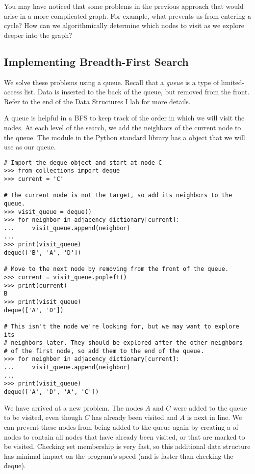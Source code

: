 You may have noticed that some problems in the previous approach that would arise in a more complicated graph.
For example, what prevents us from entering a cycle?
How can we algorithmically determine which nodes to visit as we explore deeper into the graph?

\subsection*{Implementing Breadth-First Search}

We solve these problems using a queue.
Recall that a \emph{queue} is a type of limited-access list.
Data is inserted to the back of the queue, but removed from the front.
Refer to the end of the Data Structures I lab for more details.

A queue is helpful in a BFS to keep track of the order in which we will visit the nodes.
At each level of the search, we add the neighbors of the current node to the queue.
The  module in the Python standard library has a  object that we will use as our queue.

\begin{lstlisting}
# Import the deque object and start at node C
>>> from collections import deque
>>> current = 'C'

# The current node is not the target, so add its neighbors to the queue.
>>> visit_queue = deque()
>>> for neighbor in adjacency_dictionary[current]:
...     visit_queue.append(neighbor)
...
>>> print(visit_queue)
deque(['B', 'A', 'D'])

# Move to the next node by removing from the front of the queue.
>>> current = visit_queue.popleft()
>>> print(current)
B
>>> print(visit_queue)
deque(['A', 'D'])

# This isn't the node we're looking for, but we may want to explore its
# neighbors later. They should be explored after the other neighbors
# of the first node, so add them to the end of the queue.
>>> for neighbor in adjacency_dictionary[current]:
...     visit_queue.append(neighbor)
...
>>> print(visit_queue)
deque(['A', 'D', 'A', 'C'])
\end{lstlisting}

We have arrived at a new problem.
The nodes $A$ and $C$ were added to the queue to be visited, even though $C$ has already been visited and $A$ is next in line.
We can prevent these nodes from being added to the queue again by creating a  of nodes to contain all nodes that have already been visited, or that are marked to be visited.
Checking set membership is very fast, so this additional data structure has minimal impact on the program's speed (and is faster than checking the deque).

